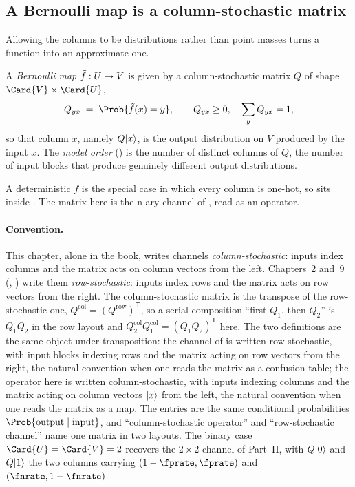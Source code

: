 \subsection*{A Bernoulli map is a column-stochastic matrix}

Allowing the columns to be distributions rather than point masses turns a
function into an approximate one.

\begin{definition}
\label{def:operator-bernoulli-map}
A \emph{Bernoulli map} $\tilde{f} : U \to V$ is given by a
column-stochastic matrix $Q$ of shape $\Card{V} \times \Card{\Universe}$,
\[
  Q_{yx} \;=\; \Prob{\tilde{f}(x) = y},
  \qquad
  Q_{yx} \ge 0,
  \quad
  \sum_{y} Q_{yx} = 1,
\]
so that column $x$, namely $Q \lvert x \rangle$, is the output distribution on $V$
produced by the input $x$. The \emph{model order} () is
the number of distinct columns of $Q$, the number of input blocks that produce
genuinely different output distributions.
\end{definition}

A deterministic $f$ is the special case in which every column is one-hot, so
 sits inside .
The matrix here is the n-ary channel of , read as an
operator.

\paragraph{Convention.} This chapter, alone in the book, writes channels
\emph{column-stochastic}: inputs index columns and the matrix acts on
column vectors from the left. Chapters~2 and~9
(, ) write
them \emph{row-stochastic}: inputs index rows and the matrix acts on row
vectors from the right. The column-stochastic matrix is the transpose of
the row-stochastic one, $Q^{\mathrm{col}} = (Q^{\mathrm{row}})^{\mathsf{T}}$,
so a serial composition ``first $Q_1$, then $Q_2$'' is $Q_1 Q_2$ in the
row layout and $Q_2^{\mathrm{col}} Q_1^{\mathrm{col}} = (Q_1 Q_2)^{\mathsf{T}}$
here. The two definitions are the same object under transposition: the
channel of  is written row-stochastic, with input
blocks indexing rows and the matrix acting on row vectors from the right, the
natural convention when one reads the matrix as a confusion table; the operator
here is written column-stochastic, with inputs indexing columns and the matrix
acting on column vectors $\lvert x \rangle$ from the left, the natural convention when
one reads the matrix as a map. The entries are the same conditional
probabilities $\Prob{\text{output} \mid \text{input}}$, and ``column-stochastic
operator'' and ``row-stochastic channel'' name one matrix in two layouts. The
binary case $\Card{\Universe} = \Card{V} = 2$ recovers the $2 \times 2$ channel
of Part~II, with $Q \lvert 0 \rangle$ and $Q \lvert 1 \rangle$ the two columns carrying
$(1 - \fprate, \fprate)$ and $(\fnrate, 1 - \fnrate)$.

